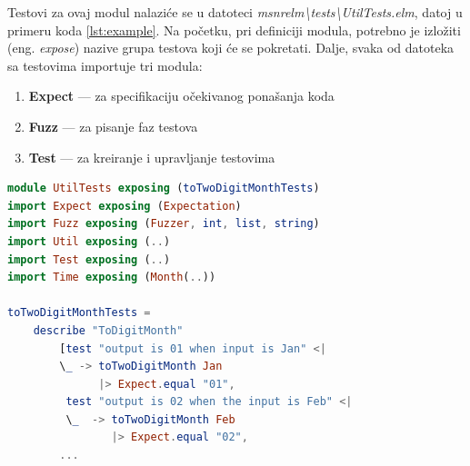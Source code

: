 \documentclass[12pt,oneside]{memoir}
\begin{document}
\par Testovi za ovaj modul nalaziće se u datoteci \emph{msnr{\textunderscore}elm{\textbackslash}tests{\textbackslash}UtilTests.elm}, datoj u primeru koda \ref{lst:example}. Na početku, pri definiciji modula, potrebno je izložiti (eng. \emph{expose}) nazive grupa testova koji će se pokretati. Dalje, svaka od datoteka sa testovima importuje tri modula: 

\begin{enumerate}
\item \textbf{Expect} --- za specifikaciju očekivanog ponašanja koda
\item \textbf{Fuzz} --- za pisanje faz testova 
\item \textbf{Test} --- za kreiranje i upravljanje testovima
\end{enumerate}

\begin{lstlisting}[language=elm, caption={Implementacija testova za funkciju \emph{toTwoDigitMonth}},captionpos=b, label={lst:example}]
module UtilTests exposing (toTwoDigitMonthTests)
import Expect exposing (Expectation)
import Fuzz exposing (Fuzzer, int, list, string)
import Util exposing (..)
import Test exposing (..)
import Time exposing (Month(..))

toTwoDigitMonthTests = 
    describe "ToDigitMonth" 
        [test "output is 01 when input is Jan" <|
        \_ -> toTwoDigitMonth Jan
              |> Expect.equal "01", 
         test "output is 02 when the input is Feb" <|
         \_  -> toTwoDigitMonth Feb
                |> Expect.equal "02",
        ... 
\end{lstlisting}
\end{document}
